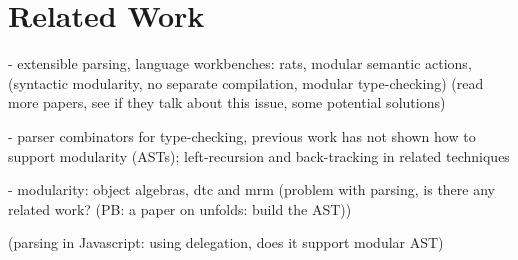 \section{Related Work}\label{sec:relatedwork}

- extensible parsing, language workbenches: rats, modular semantic actions, (syntactic modularity, no separate compilation, modular type-checking)
(read more papers, see if they talk about this issue, some potential solutions)

- parser combinators for type-checking, previous work has not shown how to support modularity (ASTs); left-recursion and back-tracking in related techniques

- modularity: object algebras, dtc and mrm (problem with parsing, is there any related work? (PB: a paper on unfolds: build the AST))

(parsing in Javascript: using delegation, does it support modular AST)